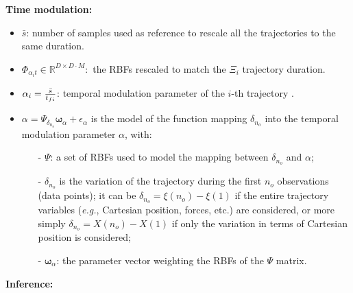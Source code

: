 \documentclass[utf8]{frontiersSCNS} %
\begin{document}
\textbf{Time modulation:}
\begin{itemize}
\item $\bar{s}$: number of samples used as reference to rescale all the trajectories to the same duration.
\item $\Phi_{\alpha_i t} \in \mathbb{R}^{D\times D \cdot M}:$ the RBFs rescaled to match the $\Xi_i$ trajectory duration.
\item $\alpha_i = { \bar{s} \over t_{fi}}$: temporal modulation parameter of the $i$-th trajectory .
\item $\alpha = \Psi_{\delta_{n_o}}\boldsymbol{\omega}_\alpha + \epsilon_\alpha$ is the model of the function mapping $\delta_{n_o}$ into the temporal modulation parameter $\alpha$, with:

\begin{itemize}
\item[-] $\Psi$: a set of RBFs used to model the mapping between $\delta_{n_o}$ and $\alpha$;
\item[-] $\delta_{n_o}$ is the variation of the trajectory during the first $n_o$ observations (data points); it can be $\delta_{n_o}=\xi(n_o) - \xi(1)$ if the entire trajectory variables (\textit{e.g.}, Cartesian position, forces, etc.) are considered, or more simply $\delta_{n_o}= X(n_o) - X(1)$ if only the variation in terms of Cartesian position is considered;
\item[-] $\boldsymbol{\omega}_\alpha$: the parameter vector weighting the RBFs of the $\Psi$ matrix. 

\end{itemize}
\end{itemize}
\textbf{Inference:}
\end{document}
